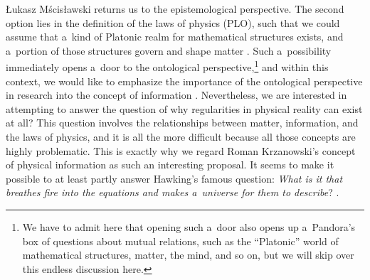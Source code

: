 \begin{artengenv}{Łukasz Mścisławski}
returns us to the epistemological perspective. The second option lies in the definition of the laws of physics (PLO), such that we could assume that a~kind of Platonic realm for mathematical structures exists, and a~portion of those structures govern and shape matter
\parencites[e.g.,][]{heller_czy_1998}[][]{penrose_road_2006}[see also][]{grygiel_critical_2022}. %
 Such a~possibility immediately opens a~door to the ontological perspective,\footnote{We have to admit here that opening such a~door also opens up a~Pandora's box of questions about mutual relations, such as the ``Platonic'' world of mathematical structures, matter, the mind, and so on, but we will skip over this endless discussion here.} and within this context, we would like to emphasize the importance of the ontological perspective in research into the concept of information 
\parencite[cf.][p.53]{krzanowski_why_2020}. %
 Nevertheless, we are interested in attempting to answer the question of why regularities in physical reality can exist at all? This question involves the relationships between matter, information, and the laws of physics, and it is all the more difficult because all those concepts are highly problematic. This is exactly why we regard Roman Krzanowski's concept of physical information as such an interesting proposal. It seems to make it possible to at least partly answer Hawking's famous question: \textit{What is it that breathes fire into the equations and makes a~universe for them to describe}? 
\parencite[][p.174]{hawking_brief_1988}.%



\end{artengenv}
